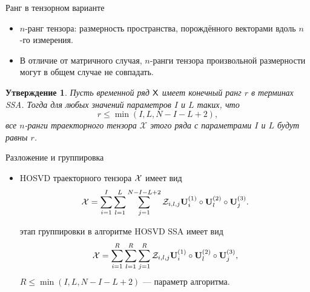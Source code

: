 \documentclass[ucs, notheorems, handout]{beamer}
\newcommand{\bluetext}[1]{{\usebeamercolor[fg]{bluetext_color}#1}}
\newtheorem{statement}{Утверждение}
\begin{document}
    \begin{frame}{Ранг в тензорном варианте}
        \begin{itemize}
            \item \bluetext{$n$-ранг тензора:} размерность пространства, порождённого
            векторами вдоль $n$-го измерения.

            \item В отличие от матричного случая, $n$-ранги тензора произвольной размерности могут в общем случае
            не совпадать.
        \end{itemize}

        \begin{statement}
            Пусть временной ряд $\mathsf{X}$ имеет конечный ранг $r$ в терминах \emph{SSA}\@.
            Тогда для любых значений параметров $I$ и $L$ таких, что
            \[
                r\leqslant\min(I, L, N-I-L+2),
            \]
            все $n$-ранги траекторного тензора $\mathcal{X}$
            этого ряда с параметрами $I$ и $L$ будут равны $r$.
        \end{statement}
    \end{frame}

    \begin{frame}{Разложение и группировка}
        \begin{itemize}
            \item HOSVD траекторного тензора $\mathcal{X}$ имеет вид
            \[
                \mathcal{X} = \sum_{i=1}^{I} \sum_{l=1}^{L} \sum_{j=1}^{N-I-L+2} \mathcal{Z}_{i,l,j} \mathbf{U}^{(1)}_{i}
                \circ \mathbf{U}^{(2)}_{l} \circ \mathbf{U}^{(3)}_{j}.
            \]

            \vspace{0.6cm}
             этап группировки в алгоритме HOSVD SSA имеет вид
            \[
                \mathcal{X} = \sum_{i=1}^{R} \sum_{l=1}^{R} \sum_{j=1}^{R} \mathcal{Z}_{i,l,j} \mathbf{U}^{(1)}_{i}
                \circ \mathbf{U}^{(2)}_{l} \circ \mathbf{U}^{(3)}_{j},
            \]
            $R\leqslant \min(I, L, N - I - L + 2)$ --- параметр алгоритма.
        \end{itemize}
    \end{frame}
\end{document}
